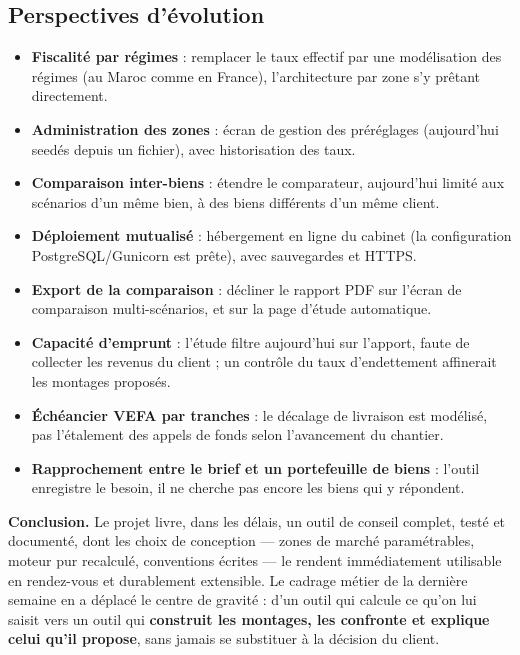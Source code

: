 \documentclass[11pt,a4paper]{article}
\begin{document}
\subsection{Perspectives d'évolution}
\begin{itemize}
	\item \textbf{Fiscalité par régimes} : remplacer le taux effectif par une modélisation des régimes (au Maroc comme en France), l'architecture par zone s'y prêtant directement.
	\item \textbf{Administration des zones} : écran de gestion des préréglages (aujourd'hui seedés depuis un fichier), avec historisation des taux.
	\item \textbf{Comparaison inter-biens} : étendre le comparateur, aujourd'hui limité aux scénarios d'un même bien, à des biens différents d'un même client.
	\item \textbf{Déploiement mutualisé} : hébergement en ligne du cabinet (la configuration PostgreSQL/Gunicorn est prête), avec sauvegardes et HTTPS.
	\item \textbf{Export de la comparaison} : décliner le rapport PDF sur l'écran de comparaison multi-scénarios, et sur la page d'étude automatique.
	\item \textbf{Capacité d'emprunt} : l'étude filtre aujourd'hui sur l'apport, faute de collecter les revenus du client ; un contrôle du taux d'endettement affinerait les montages proposés.
	\item \textbf{Échéancier VEFA par tranches} : le décalage de livraison est modélisé, pas l'étalement des appels de fonds selon l'avancement du chantier.
	\item \textbf{Rapprochement entre le brief et un portefeuille de biens} : l'outil enregistre le besoin, il ne cherche pas encore les biens qui y répondent.
\end{itemize}

\vspace{0.6cm}
\begin{tcolorbox}[colback=eccblue!5,colframe=eccblue!60,boxrule=0.6pt,arc=2pt,
	left=8pt,right=8pt,top=6pt,bottom=6pt]
	\small
	\textbf{\color{eccblue}Conclusion.} Le projet livre, dans les délais, un outil de conseil complet, testé et documenté, dont les choix de conception — zones de marché paramétrables, moteur pur recalculé, conventions écrites — le rendent immédiatement utilisable en rendez-vous et durablement extensible. Le cadrage métier de la dernière semaine en a déplacé le centre de gravité : d'un outil qui calcule ce qu'on lui saisit vers un outil qui \textbf{construit les montages, les confronte et explique celui qu'il propose}, sans jamais se substituer à la décision du client.
\end{tcolorbox}
\end{document}
